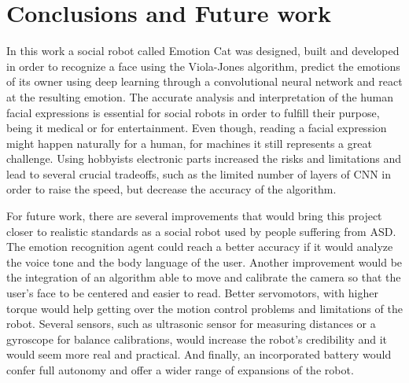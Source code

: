 \documentclass[runningheads,a4paper,12pt]{report}
\begin{document}
\chapter*{Conclusions and Future work}
In this work a social robot called Emotion Cat was designed, built and developed in order to recognize a face using the Viola-Jones algorithm, predict the emotions of its owner using deep learning through a convolutional neural network and react at the resulting emotion. The accurate analysis and interpretation of the human facial expressions is essential for social robots in order to fulfill their purpose, being it medical or for entertainment. Even though, reading a facial expression might happen naturally for a human, for machines it still represents a great challenge. Using hobbyists electronic parts increased the risks and limitations and lead to several crucial tradeoffs, such as the limited number of layers of CNN in order to raise the speed, but decrease the accuracy of the algorithm. 

For future work, there are several improvements that would bring this project closer to realistic standards as a social robot used by people suffering from ASD. The emotion recognition agent could reach a better accuracy if it would analyze the voice tone and the body language of the user. Another improvement would be the integration of an algorithm able to move and calibrate the camera so that the user's face to be centered and easier to read. Better servomotors, with higher torque would help getting over the motion control problems and limitations of the robot. Several sensors, such as ultrasonic sensor for measuring distances or a gyroscope for balance calibrations, would increase the robot's credibility and it would seem more real and practical. And finally, an incorporated battery would confer full autonomy and offer a wider range of expansions of the robot. 
\end{document}
